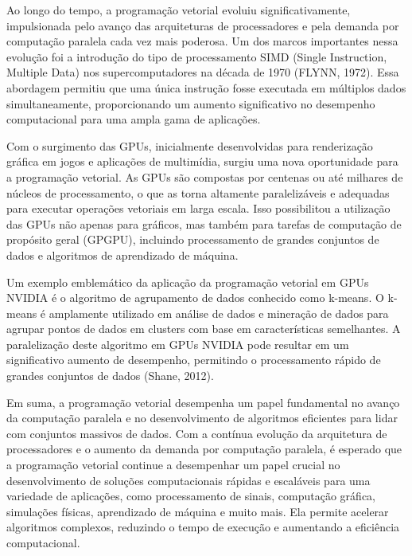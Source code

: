 \documentclass[12pt, %
openright, 
oneside, %
a4paper,    %
brazil]{facom-ufu-abntex2}
\begin{document}
Ao longo do tempo, a programação vetorial evoluiu significativamente, impulsionada pelo avanço das arquiteturas de processadores e pela demanda por computação paralela cada vez mais poderosa. Um dos marcos importantes nessa evolução foi a introdução do tipo de processamento SIMD (Single Instruction, Multiple Data) nos supercomputadores na década de 1970 (FLYNN, 1972). Essa abordagem permitiu que uma única instrução fosse executada em múltiplos dados simultaneamente, proporcionando um aumento significativo no desempenho computacional para uma ampla gama de aplicações.

Com o surgimento das GPUs, inicialmente desenvolvidas para renderização gráfica em jogos e aplicações de multimídia, surgiu uma nova oportunidade para a programação vetorial. As GPUs são compostas por centenas ou até milhares de núcleos de processamento, o que as torna altamente paralelizáveis e adequadas para executar operações vetoriais em larga escala. Isso possibilitou a utilização das GPUs não apenas para gráficos, mas também para tarefas de computação de propósito geral (GPGPU), incluindo processamento de grandes conjuntos de dados e algoritmos de aprendizado de máquina.

Um exemplo emblemático da aplicação da programação vetorial em GPUs NVIDIA é o algoritmo de agrupamento de dados conhecido como k-means. O k-means é amplamente utilizado em análise de dados e mineração de dados para agrupar pontos de dados em clusters com base em características semelhantes. A paralelização deste algoritmo em GPUs NVIDIA pode resultar em um significativo aumento de desempenho, permitindo o processamento rápido de grandes conjuntos de dados (Shane, 2012).

Em suma, a programação vetorial desempenha um papel fundamental no avanço da computação paralela e no desenvolvimento de algoritmos eficientes para lidar com conjuntos massivos de dados. Com a contínua evolução da arquitetura de processadores e o aumento da demanda por computação paralela, é esperado que a programação vetorial continue a desempenhar um papel crucial no desenvolvimento de soluções computacionais rápidas e escaláveis para uma variedade de aplicações, como processamento de sinais, computação gráfica, simulações físicas, aprendizado de máquina e muito mais. Ela permite acelerar algoritmos complexos, reduzindo o tempo de execução e aumentando a eficiência computacional.

\end{document}
